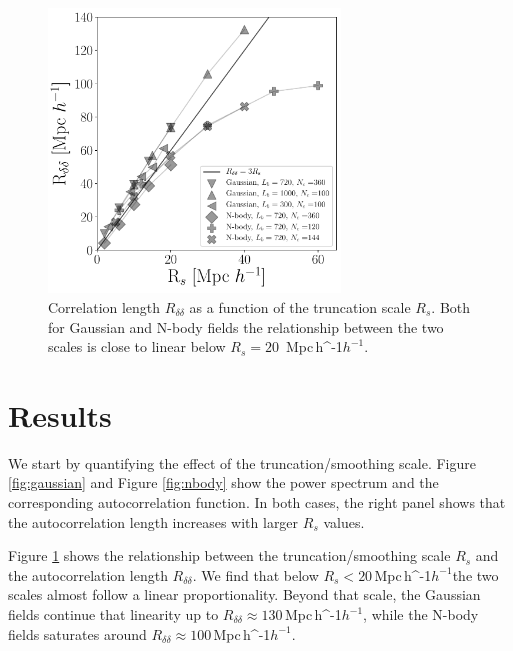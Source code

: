 \documentclass[usenatbib]{mnras}
\newcommand{\Mpch}{\,{\rm Mpc}\,\ifmmode h^{-1}\else $h^{-1}$\fi}
\begin{document}
\begin{figure}
    \centering
    \includegraphics[width=220pt]{correlation_length.pdf}
    \caption{Correlation length $R_{\delta\delta}$ as a function of the truncation scale $R_s$.
    Both for Gaussian and N-body fields the relationship between the two scales is close to linear below $R_{s}=20$ \Mpch.}
    \label{fig:correlation length}
\end{figure}

\section{Results}
\label{sec:results}

We start by quantifying the effect of the truncation/smoothing scale.
Figure \ref{fig:gaussian} and Figure \ref{fig:nbody} show the power spectrum and the corresponding autocorrelation function.
In both cases, the right panel shows that the autocorrelation length increases with larger $R_{s}$ values.

Figure \ref{fig:correlation length} shows the relationship between the truncation/smoothing scale $R_s$ and the autocorrelation length $R_{\delta\delta}$.
We find that below $R_{s} < 20$\Mpch the two scales almost follow a linear proportionality.
Beyond that scale, the Gaussian fields continue that linearity up to $R_{\delta\delta}\approx 130$\Mpch, while the N-body fields saturates around $R_{\delta\delta}\approx 100$\Mpch.
\end{document}

